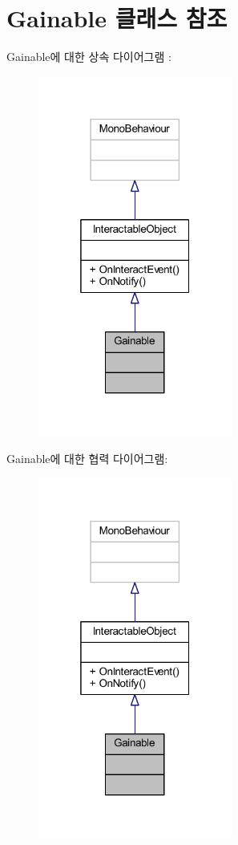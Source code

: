 \hypertarget{class_gainable}{}\section{Gainable 클래스 참조}
\label{class_gainable}


Gainable에 대한 상속 다이어그램 \+: 
\nopagebreak
\begin{figure}[H]
\begin{center}
\leavevmode
\includegraphics[width=181pt]{df/d54/class_gainable__inherit__graph}
\end{center}
\end{figure}


Gainable에 대한 협력 다이어그램\+:
\nopagebreak
\begin{figure}[H]
\begin{center}
\leavevmode
\includegraphics[width=181pt]{d8/dd3/class_gainable__coll__graph}
\end{center}
\end{figure}
